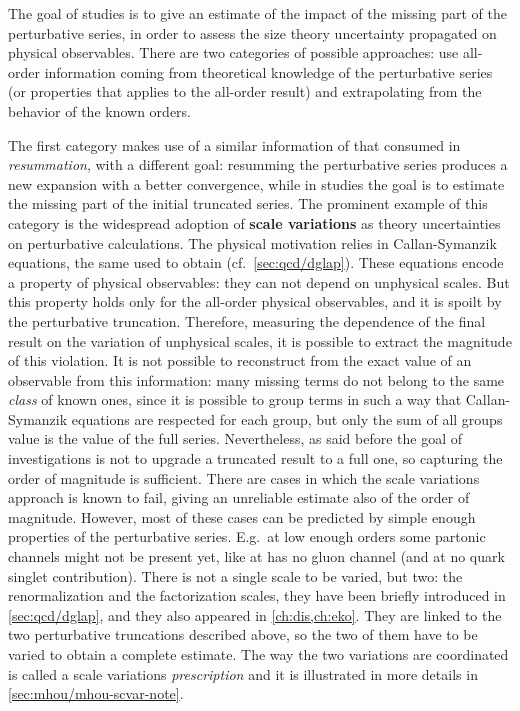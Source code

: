 
The goal of \mhou studies is to give an estimate of the impact of the missing
part of the perturbative series, in order to assess the size theory uncertainty
propagated on physical observables.
%
There are two categories of possible approaches: use all-order information
coming from theoretical knowledge of the perturbative series (or properties
that applies to the all-order result) and extrapolating from the behavior of
the known orders.

The first category makes use of a similar information of that consumed in
\textit{resummation}, with a different goal: resumming the perturbative series
produces a new expansion with a better convergence, while in \mhou studies the
goal is to estimate the missing part of the initial truncated series.
%
The prominent example of this category is the widespread adoption of
\textbf{scale variations} as theory uncertainties on perturbative calculations.
The physical motivation relies in Callan-Symanzik equations, the same used to
obtain \dglap (cf.\ \cref{sec:qcd/dglap}).
%
These equations encode a property of physical observables: they can not depend
on unphysical scales.
But this property holds only for the all-order physical observables, and it is
spoilt by the perturbative truncation.
Therefore, measuring the dependence of the final result on the variation of
unphysical scales, it is possible to extract the magnitude of this violation. 
%
It is not possible to reconstruct from the exact value of an observable from
this information: many missing terms do not belong to the same \textit{class}
of known ones, since it is possible to group terms in such a way that
Callan-Symanzik equations are respected for each group, but only the sum of all
groups value is the value of the full series.
%
Nevertheless, as said before the goal of \mhou investigations is not to upgrade
a truncated result to a full one, so capturing the order of magnitude is
sufficient.
%
There are cases in which the scale variations approach is known to fail, giving
an unreliable estimate also of the order of magnitude.
However, most of these cases can be predicted by simple enough properties of
the perturbative series.
E.g.\ at low enough orders some partonic channels might not be present yet,
like \dis at \lo has no gluon channel (and at \nlo no quark singlet
contribution).
%
There is not a single scale to be varied, but two: the renormalization and the
factorization scales, they have been briefly introduced in
\cref{sec:qcd/dglap}, and they also appeared in \cref{ch:dis,ch:eko}.
They are linked to the two perturbative truncations described above, so the two
of them have to be varied to obtain a complete estimate.
The way the two variations are coordinated is called a scale variations
\textit{prescription} and it is illustrated in more details in
\cref{sec:mhou/mhou-scvar-note}. 

